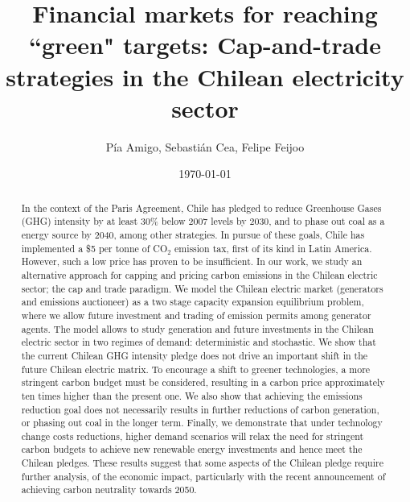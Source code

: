 \documentclass[11pt, letterpaper]{article}
\title{Financial markets for reaching ``green" targets: Cap-and-trade strategies in the Chilean electricity sector}
\author{P\'ia Amigo, Sebasti{\'a}n Cea, Felipe Feijoo}
\date{\today}
\begin{document}
\linenumbers
\maketitle

\begin{abstract}
In the context of the Paris Agreement, Chile has pledged to reduce Greenhouse Gases (GHG) intensity by at least 30\% below 2007 levels by 2030, and to phase out coal as a energy source by 2040, among other strategies. In pursue of these goals, Chile has implemented a \$5 per tonne of CO$_2$ emission tax, first of its kind in Latin America. However, such a low price has proven to be insufficient. In our work, we study an alternative approach for capping and pricing carbon emissions in the Chilean electric sector; the cap and trade paradigm. We model the Chilean electric market (generators and emissions auctioneer) as a two stage capacity expansion equilibrium problem, where we allow future investment and trading of emission permits among generator agents. The model allows to study generation and future investments in the Chilean electric sector in two regimes of demand: deterministic and stochastic. We show that the current Chilean GHG intensity pledge does not drive an important shift in the future Chilean electric matrix. To encourage a shift to greener technologies, a more stringent carbon budget must be considered, resulting in a carbon price approximately ten times higher than the present one. We also show that achieving the emissions reduction goal does not necessarily results in further reductions of carbon generation, or phasing out coal in the longer term. Finally, we demonstrate that under technology change costs reductions, higher demand scenarios will relax the need for stringent carbon budgets to achieve new renewable energy investments and hence meet the Chilean pledges. These results suggest that some aspects of the Chilean pledge require further analysis, of the economic impact, particularly with the recent announcement of achieving carbon neutrality towards 2050. 
\end{abstract}
\end{document}
